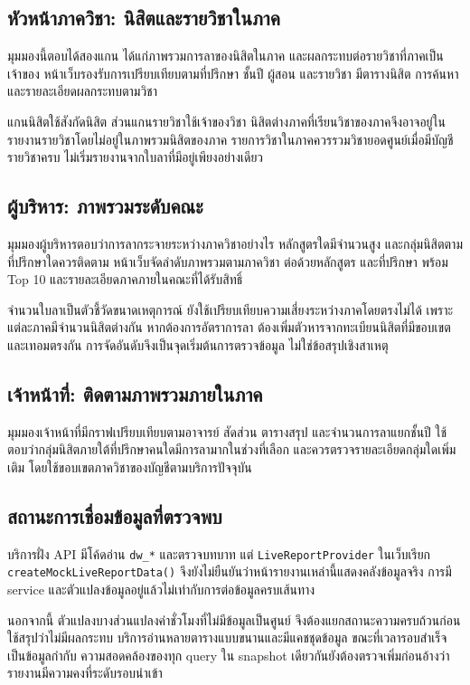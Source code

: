 \subsection{หัวหน้าภาควิชา: นิสิตและรายวิชาในภาค}
มุมมองนี้ตอบได้สองแกน ได้แก่ภาพรวมการลาของนิสิตในภาค และผลกระทบต่อรายวิชาที่ภาคเป็นเจ้าของ หน้าเว็บรองรับการเปรียบเทียบตามที่ปรึกษา ชั้นปี ผู้สอน และรายวิชา มีตารางนิสิต การค้นหา และรายละเอียดผลกระทบตามวิชา

แกนนิสิตใช้สังกัดนิสิต ส่วนแกนรายวิชาใช้เจ้าของวิชา นิสิตต่างภาคที่เรียนวิชาของภาคจึงอาจอยู่ในรายงานรายวิชาโดยไม่อยู่ในภาพรวมนิสิตของภาค รายการวิชาในภาคควรรวมวิชายอดศูนย์เมื่อมีบัญชีรายวิชาครบ ไม่เริ่มรายงานจากใบลาที่มีอยู่เพียงอย่างเดียว

\subsection{ผู้บริหาร: ภาพรวมระดับคณะ}
มุมมองผู้บริหารตอบว่าการลากระจายระหว่างภาควิชาอย่างไร หลักสูตรใดมีจำนวนสูง และกลุ่มนิสิตตามที่ปรึกษาใดควรติดตาม หน้าเว็บจัดลำดับภาพรวมตามภาควิชา ต่อด้วยหลักสูตร และที่ปรึกษา พร้อม Top 10 และรายละเอียดภาคภายในคณะที่ได้รับสิทธิ์

จำนวนใบลาเป็นตัวชี้วัดขนาดเหตุการณ์ ยังใช้เปรียบเทียบความเสี่ยงระหว่างภาคโดยตรงไม่ได้ เพราะแต่ละภาคมีจำนวนนิสิตต่างกัน หากต้องการอัตราการลา ต้องเพิ่มตัวหารจากทะเบียนนิสิตที่มีขอบเขตและเทอมตรงกัน การจัดอันดับจึงเป็นจุดเริ่มต้นการตรวจข้อมูล ไม่ใช่ข้อสรุปเชิงสาเหตุ

\subsection{เจ้าหน้าที่: ติดตามภาพรวมภายในภาค}
มุมมองเจ้าหน้าที่มีกราฟเปรียบเทียบตามอาจารย์ สัดส่วน ตารางสรุป และจำนวนการลาแยกชั้นปี ใช้ตอบว่ากลุ่มนิสิตภายใต้ที่ปรึกษาคนใดมีการลามากในช่วงที่เลือก และควรตรวจรายละเอียดกลุ่มใดเพิ่มเติม โดยใช้ขอบเขตภาควิชาของบัญชีตามบริการปัจจุบัน

\subsection{สถานะการเชื่อมข้อมูลที่ตรวจพบ}
บริการฝั่ง API มีโค้ดอ่าน \nolinkurl{dw_*} และตรวจบทบาท แต่ \nolinkurl{LiveReportProvider} ในเว็บเรียก \nolinkurl{createMockLiveReportData()} จึงยังไม่ยืนยันว่าหน้ารายงานเหล่านี้แสดงคลังข้อมูลจริง การมี service และตัวแปลงข้อมูลอยู่แล้วไม่เท่ากับการต่อข้อมูลครบเส้นทาง

นอกจากนี้ ตัวแปลงบางส่วนแปลงค่าชั่วโมงที่ไม่มีข้อมูลเป็นศูนย์ จึงต้องแยกสถานะความครบถ้วนก่อนใช้สรุปว่าไม่มีผลกระทบ บริการอ่านหลายตารางแบบขนานและมีแคชชุดข้อมูล ขณะที่เวลารอบสำเร็จเป็นข้อมูลกำกับ ความสอดคล้องของทุก query ใน snapshot เดียวกันยังต้องตรวจเพิ่มก่อนอ้างว่ารายงานมีความคงที่ระดับรอบนำเข้า
